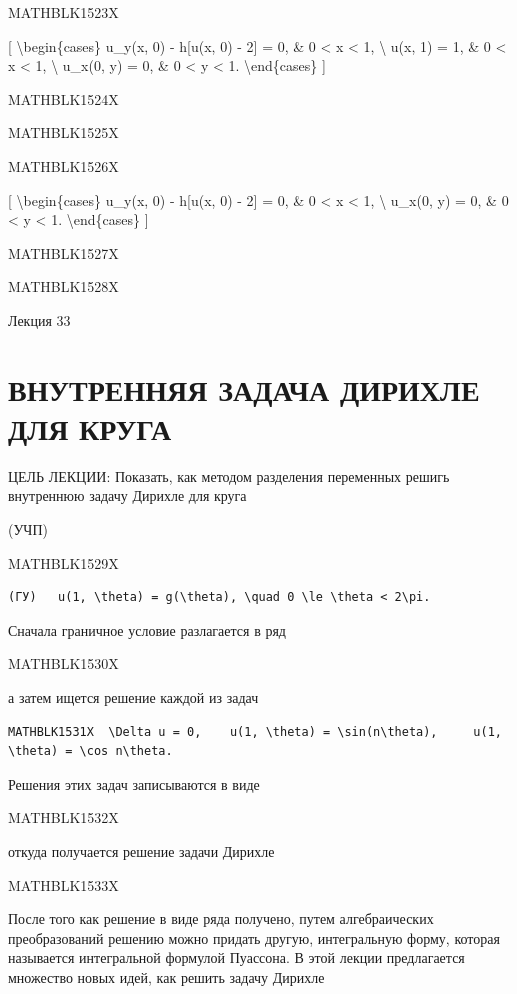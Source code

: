 \documentclass[
]{article}
\begin{document}
MATHBLK1523X

{[} \textbackslash begin\{cases\} u\_y(x, 0) - h{[}u(x, 0) - 2{]} = 0,
\& 0 \textless{} x \textless{} 1, \textbackslash{} u(x, 1) = 1, \& 0
\textless{} x \textless{} 1, \textbackslash{} u\_x(0, y) = 0, \& 0
\textless{} y \textless{} 1. \textbackslash end\{cases\} {]}

MATHBLK1524X

MATHBLK1525X

MATHBLK1526X

{[} \textbackslash begin\{cases\} u\_y(x, 0) - h{[}u(x, 0) - 2{]} = 0,
\& 0 \textless{} x \textless{} 1, \textbackslash{} u\_x(0, y) = 0, \& 0
\textless{} y \textless{} 1. \textbackslash end\{cases\} {]}

MATHBLK1527X

MATHBLK1528X

Лекция 33

\section{ВНУТРЕННЯЯ ЗАДАЧА ДИРИХЛЕ ДЛЯ
КРУГА}\label{ux432ux43dux443ux442ux440ux435ux43dux43dux44fux44f-ux437ux430ux434ux430ux447ux430-ux434ux438ux440ux438ux445ux43bux435-ux434ux43bux44f-ux43aux440ux443ux433ux430}

ЦЕЛЬ ЛЕКЦИИ: Показать, как методом разделения переменных решигь
внутреннюю задачу Дирихле для круга

(УЧП)

MATHBLK1529X

\begin{verbatim}
(ГУ)   u(1, \theta) = g(\theta), \quad 0 \le \theta < 2\pi.
\end{verbatim}

Сначала граничное условие разлагается в ряд

MATHBLK1530X

а затем ищется решение каждой из задач

\begin{verbatim}
MATHBLK1531X  \Delta u = 0,    u(1, \theta) = \sin(n\theta),     u(1, \theta) = \cos n\theta.
\end{verbatim}

Решения этих задач записываются в виде

MATHBLK1532X

откуда получается решение задачи Дирихле

MATHBLK1533X

После того как решение в виде ряда получено, путем алгебраических
преобразований решению можно придать другую, интегральную форму, которая
называется интегральной формулой Пуассона. В этой лекции предлагается
множество новых идей, как решить задачу Дирихле
\end{document}
